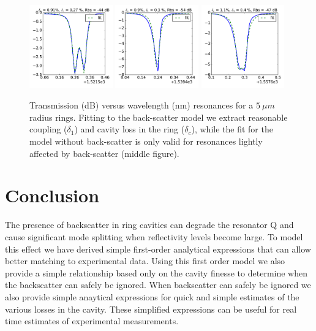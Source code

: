 \documentclass[10pt]{article}
\begin{document}
\begin{figure}[htbp]
\includegraphics[width=0.32\textwidth]{figures/bs1521.pdf}
\includegraphics[width=0.32\textwidth]{figures/bs1539.pdf}
\includegraphics[width=0.32\textwidth]{figures/bs1557.pdf}

\caption{Transmission (dB) versus wavelength (nm) resonances for a $5~\mu m$ radius rings.
Fitting to the back-scatter model  we extract reasonable coupling ($\delta_1$) and cavity loss in the ring ($\delta_c$), while the fit for the model without back-scatter  is only valid for resonances lightly affected by back-scatter (middle figure).}
\label{fig:bs_measurements}
\end{figure}





\section{Conclusion}
The presence of backscatter in ring cavities can degrade the resonator Q and cause significant mode splitting when reflectivity levels become large.   To model this effect we have derived simple first-order analytical expressions that can allow better matching to experimental data. Using this first order model we also provide a simple relationship based only on the cavity finesse to determine when the backscatter can safely be ignored.  When backscatter can safely be  ignored we also provide simple anaytical expressions for quick and simple estimates of the various losses in the cavity.  These simplified expressions can be useful for real time estimates of experimental measurements.     
\end{document}
